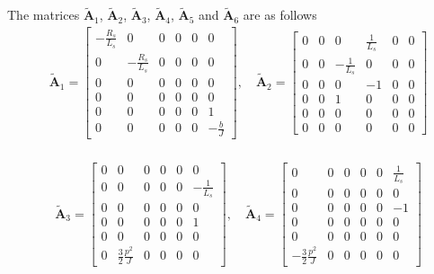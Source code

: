 \documentclass[11pt,a4paper]{scrartcl}
\numberwithin{equation}{section}
\theoremstyle{it}
\theoremstyle{definition}
\begin{document}
\begin{onehalfspace}
The matrices $\tilde{\mathbf{A}}_1$, $\tilde{\mathbf{A}}_2$, 
$\tilde{\mathbf{A}}_3$, $\tilde{\mathbf{A}}_4$, $\tilde{\mathbf{A}}_5$ and $\tilde{\mathbf{A}}_6$ are as follows
\begin{equation}\label{}
	\begin{aligned}
		&\tilde{\mathbf{A}}_1 = 
		\begin{bmatrix} 
			-\frac{R_s}{L_s} & 0 & 0 & 0 & 0 & 0 \\[6pt]			
			0 & -\frac{R_s}{L_s} & 0 & 0 & 0 & 0 \\[6pt]
			0 & 0 & 0 & 0 & 0 & 0 \\[6pt]
			0 & 0 & 0 & 0 & 0 & 0 \\[6pt]
			0 & 0 & 0 & 0 & 0 & 1 \\[6pt]
			0 & 0 & 0 & 0 & 0 & -\frac{b}{J}
		\end{bmatrix},\quad
		\tilde{\mathbf{A}}_2 = 
		\begin{bmatrix} 
			0 & 0 & 0 & \frac{1}{L_s} & 0 & 0 \\[6pt]			
			0 & 0 & -\frac{1}{L_s} & 0 & 0 & 0 \\[6pt]
			0 & 0 & 0 & -1 & 0 & 0 \\[6pt]
			0 & 0 & 1 & 0 & 0 & 0 \\[6pt]
			0 & 0 & 0 & 0 & 0 & 0 \\[6pt]
			0 & 0 & 0 & 0 & 0 & 0
		\end{bmatrix} \\[8pt]
	\end{aligned}
\end{equation}

\begin{equation}
	\begin{aligned}
		&\tilde{\mathbf{A}}_3 = 
		\begin{bmatrix} 
			0 & 0 & 0 & 0 & 0 & 0 \\[6pt]			
			0 & 0 & 0 & 0 & 0 & -\frac{1}{L_s} \\[6pt]
			0 & 0 & 0 & 0 & 0 & 0 \\[6pt]
			0 & 0 & 0 & 0 & 0 & 1 \\[6pt]
			0 & 0 & 0 & 0 & 0 & 0 \\[6pt]
			0 & \frac{3}{2}\frac{p^2}{J} & 0 & 0 & 0 & 0
		\end{bmatrix},\quad
		\tilde{\mathbf{A}}_4 = 
		\begin{bmatrix} 
			0 & 0 & 0 & 0 & 0 & \frac{1}{L_s} \\[6pt]			
			0 & 0 & 0 & 0 & 0 & 0 \\[6pt]
			0 & 0 & 0 & 0 & 0 & -1 \\[6pt]
			0 & 0 & 0 & 0 & 0 & 0 \\[6pt]
			0 & 0 & 0 & 0 & 0 & 0 \\[6pt]
			-\frac{3}{2}\frac{p^2}{J} & 0 & 0 & 0 & 0 & 0
		\end{bmatrix} 
	\end{aligned}
\end{equation} 


\end{onehalfspace}
\end{document}
